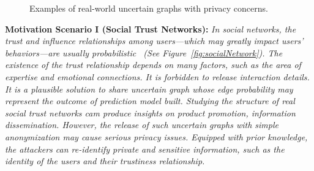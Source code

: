 \begin{figure}[!htb]
    \vspace{-5pt}
    \caption{Examples of real-world uncertain graphs with privacy concerns.}
    \vspace{-15pt}
\end{figure}
{\textbf{Motivation Scenario I (Social Trust Networks): }}
{\em 
In social networks, the trust and influence relationships among users---which may greatly impact users' behaviors---are usually probabilistic~\cite{Kempe_Maximizing_2003} 
(See Figure~\ref{fig:socialNetwork}). The existence of the trust relationship depends on many factors, such as the area of expertise and emotional connections. 
It is forbidden to release interaction details. It is a plausible solution to share uncertain graph whose edge probability may represent the outcome of prediction model built.
Studying the structure of \emph{real} social trust networks cam produce insights on product promotion, information dissemination. 
However, the release of such uncertain graphs with simple anonymization may cause serious privacy issues.
Equipped with prior knowledge, the attackers can re-identify private and sensitive information, such as the identity of the users and their trustiness relationship.
}

